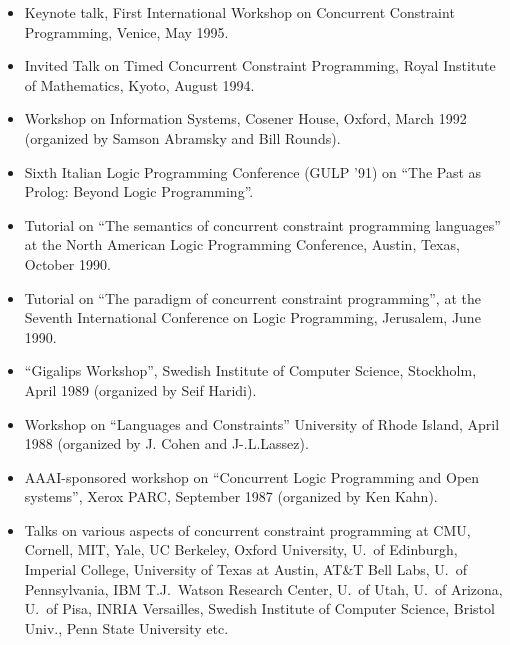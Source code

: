 \documentclass{article}
\begin{document}
\begin{itemize}
 \item Keynote talk, First International Workshop on
    Concurrent Constraint Programming, Venice, May 1995. 

 \item Invited Talk on Timed Concurrent Constraint
    Programming, Royal Institute of Mathematics, Kyoto, August
    1994. 

 \item Workshop on Information Systems, Cosener House, Oxford,
    March 1992 (organized by Samson Abramsky and Bill Rounds).

 \item Sixth Italian Logic Programming Conference (GULP '91)
    on ``The Past as Prolog: Beyond Logic Programming''.

 \item Tutorial on ``The semantics of concurrent constraint
    programming languages'' at the North American Logic Programming
    Conference, Austin, Texas, October 1990.

 \item Tutorial on ``The paradigm of concurrent constraint
    programming'', at the Seventh  International Conference on Logic
    Programming, Jerusalem, June 1990. 

 \item ``Gigalips Workshop'', Swedish Institute of Computer
    Science, Stockholm, April 1989 (organized by Seif Haridi).

 \item Workshop on ``Languages and Constraints''  University of
    Rhode Island, April 1988 (organized by J. Cohen and J-.L.Lassez).

 \item AAAI-sponsored workshop on ``Concurrent Logic Programming
    and Open systems'', Xerox PARC, September 1987 (organized by Ken
    Kahn).

 \item Talks on various aspects of concurrent constraint programming
    at CMU, Cornell, MIT, Yale, UC Berkeley, Oxford University, U.~of
    Edinburgh, Imperial College, University of Texas at Austin, AT\&T
    Bell Labs, U.~of Pennsylvania, IBM T.J.~Watson Research Center,
    U.~of Utah, U.~of Arizona, U.~of Pisa, INRIA Versailles, Swedish
    Institute of Computer Science, Bristol Univ., Penn State
    University etc.
\end{itemize}
\end{document}

